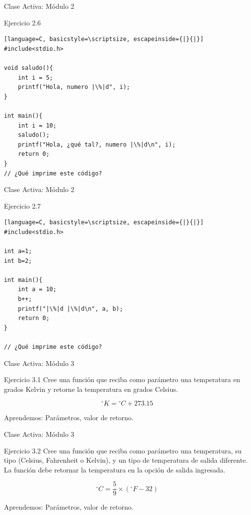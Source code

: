 \documentclass{beamer}
\begin{document}
\begin{frame}[fragile]{Clase Activa: Módulo 2}
\begin{exampleblock}{Ejercicio 2.6}
\begin{lstlisting}[language=C, basicstyle=\scriptsize, escapeinside={|}{|}]
#include<stdio.h>

void saludo(){
	int i = 5;
	printf("Hola, numero |\%|d", i);
}

int main(){
	int i = 10;
	saludo();
	printf("Hola, ¿qué tal?, numero |\%|d\n", i);
	return 0;
}
// ¿Qué imprime este código?
\end{lstlisting}
\end{exampleblock}
\end{frame}

\begin{frame}[fragile]{Clase Activa: Módulo 2}
\begin{exampleblock}{Ejercicio 2.7}
\begin{lstlisting}[language=C, basicstyle=\scriptsize, escapeinside={|}{|}]
#include<stdio.h>

int a=1;
int b=2; 

int main(){
	int a = 10; 
	b++;
	printf("|\%|d |\%|d\n", a, b); 
	return 0;
}

// ¿Qué imprime este código?
\end{lstlisting}
\end{exampleblock}
\end{frame}


\begin{frame}[fragile]{Clase Activa: Módulo 3}
\begin{exampleblock}{Ejercicio 3.1}
Cree una función que reciba como parámetro una temperatura en grados Kelvin y retorne la temperatura en grados Celsius.

$$ {^\circ}K = {^\circ}C + 273.15 $$
\end{exampleblock}

{\tiny Aprendemos: Parámetros, valor de retorno.}
\end{frame}

\begin{frame}[fragile]{Clase Activa: Módulo 3}
\begin{exampleblock}{Ejercicio 3.2}
Cree una función que reciba como parámetro una temperatura, su tipo (Celsius, Fahrenheit o Kelvin), y un tipo de temperatura de salida diferente. La función debe retornar la temperatura en la opción de salida ingresada.

$$ {^\circ}C = \frac{5}{9} \times ({^\circ}F - 32) $$
\end{exampleblock}

{\tiny Aprendemos: Parámetros, valor de retorno.}
\end{frame}
\end{document}
